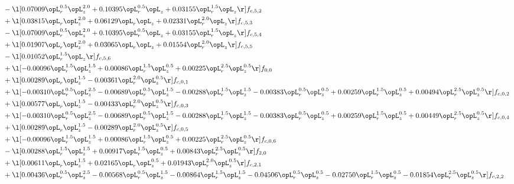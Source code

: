 \begin{alignat}{2}
& - \l[  0.07009 \opL_r^{0.5} \opL_z^{2.0} +  0.10395 \opL_r^{0.5} \opL_z +  0.03155 \opL_r^{1.5} \opL_z  \r] f_{c,5,2} \nonumber \\ 
& + \l[  0.03815 \opL_r \opL_z^{2.0} +  0.06129 \opL_r \opL_z +  0.02331 \opL_r^{2.0} \opL_z  \r] f_{c,5,3} \nonumber \\ 
& - \l[  0.07009 \opL_r^{0.5} \opL_z^{2.0} +  0.10395 \opL_r^{0.5} \opL_z +  0.03155 \opL_r^{1.5} \opL_z  \r] f_{c,5,4} \nonumber \\ 
& + \l[  0.01907 \opL_r \opL_z^{2.0} +  0.03065 \opL_r \opL_z +  0.01554 \opL_r^{2.0} \opL_z  \r] f_{c,5,5} \nonumber \\ 
& - \l[  0.01052 \opL_r^{1.5} \opL_z  \r] f_{c,5,6} \nonumber \\ 
& + \l[  -0.00096 \opL_r^{1.5} \opL_z^{1.5} +  0.00086 \opL_r^{1.5} \opL_z^{0.5} +  0.00225 \opL_r^{2.5} \opL_z^{0.5}  \r] f_{0,0} \nonumber \\ 
& + \l[  0.00289 \opL_r \opL_z^{1.5}   -0.00361 \opL_r^{2.0} \opL_z^{0.5}  \r] f_{c,0,1} \nonumber \\ 
& + \l[  -0.00310 \opL_r^{0.5} \opL_z^{2.5}   -0.00689 \opL_r^{0.5} \opL_z^{1.5}   -0.00288 \opL_r^{1.5} \opL_z^{1.5}   -0.00383 \opL_r^{0.5} \opL_z^{0.5} +  0.00259 \opL_r^{1.5} \opL_z^{0.5} +  0.00494 \opL_r^{2.5} \opL_z^{0.5}  \r] f_{c,0,2} \nonumber \\ 
& + \l[  0.00577 \opL_r \opL_z^{1.5}   -0.00433 \opL_r^{2.0} \opL_z^{0.5}  \r] f_{c,0,3} \nonumber \\ 
& + \l[  -0.00310 \opL_r^{0.5} \opL_z^{2.5}   -0.00689 \opL_r^{0.5} \opL_z^{1.5}   -0.00288 \opL_r^{1.5} \opL_z^{1.5}   -0.00383 \opL_r^{0.5} \opL_z^{0.5} +  0.00259 \opL_r^{1.5} \opL_z^{0.5} +  0.00449 \opL_r^{2.5} \opL_z^{0.5}  \r] f_{c,0,4} \nonumber \\ 
& + \l[  0.00289 \opL_r \opL_z^{1.5}   -0.00289 \opL_r^{2.0} \opL_z^{0.5}  \r] f_{c,0,5} \nonumber \\ 
& + \l[  -0.00096 \opL_r^{1.5} \opL_z^{1.5} +  0.00086 \opL_r^{1.5} \opL_z^{0.5} +  0.00225 \opL_r^{2.5} \opL_z^{0.5}  \r] f_{c,0,6} \nonumber \\ 
& - \l[  0.00288 \opL_r^{1.5} \opL_z^{1.5} +  0.00917 \opL_r^{1.5} \opL_z^{0.5} +  0.00843 \opL_r^{2.5} \opL_z^{0.5}  \r] f_{2,0} \nonumber \\ 
& + \l[  0.00611 \opL_r \opL_z^{1.5} +  0.02165 \opL_r \opL_z^{0.5} +  0.01943 \opL_r^{2.0} \opL_z^{0.5}  \r] f_{c,2,1} \nonumber \\ 
& + \l[  0.00436 \opL_r^{0.5} \opL_z^{2.5}   -0.00568 \opL_r^{0.5} \opL_z^{1.5}   -0.00864 \opL_r^{1.5} \opL_z^{1.5}   -0.04506 \opL_r^{0.5} \opL_z^{0.5}   -0.02750 \opL_r^{1.5} \opL_z^{0.5}   -0.01854 \opL_r^{2.5} \opL_z^{0.5}  \r] f_{c,2,2} \nonumber \\ 

\end{alignat}
